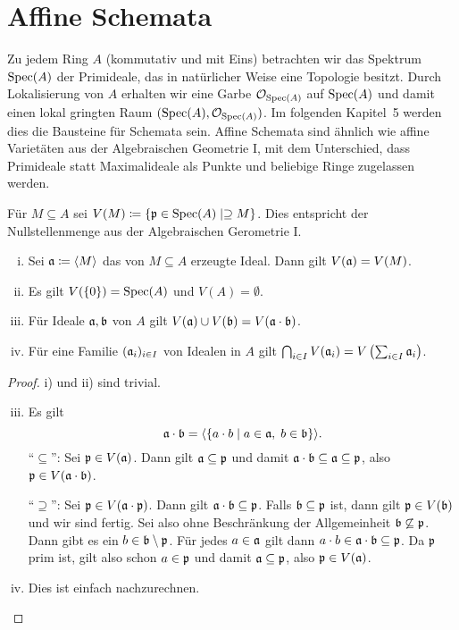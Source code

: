 
\chapter{Affine Schemata}

Zu jedem Ring $A$ (kommutativ und mit Eins) betrachten wir das Spektrum $\operatorname{Spec}(A)$ der Primideale, das in natürlicher Weise eine Topologie besitzt. Durch Lokalisierung von $A$ erhalten wir eine Garbe $\mathcal{O}_{\operatorname{Spec}(A)}$ auf $\operatorname{Spec}(A)$ und damit einen lokal gringten Raum $(\operatorname{Spec}(A),\mathcal{O}_{\operatorname{Spec}(A)})$. Im folgenden Kapitel~5 werden dies die Bausteine für Schemata sein. Affine Schemata sind ähnlich wie affine Varietäten aus der Algebraischen Geometrie I, mit dem Unterschied, dass Primideale statt Maximalideale als Punkte und beliebige Ringe zugelassen werden.

\begin{defn}
	Für $M\subseteq A$ sei $V(M)\coloneqq\{\mathfrak{p} \in \operatorname{Spec}(A) \mid \supseteq M \}$. Dies entspricht der Nullstellenmenge aus der Algebraischen Gerometrie I.
\end{defn}

\begin{lem}
\label{lem:4.2}
	\begin{enumerate}[i)]
		\item Sei $\mathfrak{a}\coloneqq \langle M \rangle$ das von $M\subseteq A$ erzeugte Ideal. Dann gilt $V(\mathfrak{a}) = V(M)$.
		\item Es gilt $V(\{0\}) = \operatorname{Spec}(A)$ und $V(A) = \emptyset$.
		\item Für Ideale $\mathfrak{a},\mathfrak{b}$ von $A$ gilt $V(\mathfrak{a}) \cup V(\mathfrak{b}) = V(\mathfrak{a} \cdot \mathfrak{b})$.
		\item Für eine Familie $(\mathfrak{a}_i)_{i\in I}$ von Idealen in $A$ gilt $\bigcap_{i\in I}V(\mathfrak{a}_i) = V\left(\sum_{i \in I} \mathfrak{a}_i\right)$.
	\end{enumerate}
	\begin{proof}
		i) und ii) sind trivial.
		\begin{enumerate}[i)]
		\setcounter{enumi}{2}
		\item Es gilt
		\[
			\mathfrak{a} \cdot \mathfrak{b} = \langle \{a \cdot b \mid a \in \mathfrak{a},\; b \in \mathfrak{b}\} \rangle .
		\]
		\enquote{$\subseteq$}: Sei $\mathfrak{p} \in V(\mathfrak{a})$. Dann gilt $\mathfrak{a} \subseteq \mathfrak{p}$ und damit $\mathfrak{a} \cdot \mathfrak{b} \subseteq \mathfrak{a} \subseteq \mathfrak{p}$, also $\mathfrak{p} \in V(\mathfrak{a} \cdot \mathfrak{b})$.

		\enquote{$\supseteq$}: Sei $\mathfrak{p} \in V(\mathfrak{a} \cdot \mathfrak{p})$. Dann gilt $\mathfrak{a} \cdot \mathfrak{b} \subseteq \mathfrak{p}$. Falls $\mathfrak{b} \subseteq \mathfrak{p}$ ist, dann gilt $\mathfrak{p} \in V(\mathfrak{b})$ und wir sind fertig. Sei also ohne Beschränkung der Allgemeinheit $\mathfrak{b} \not\subseteq \mathfrak{p}$. Dann gibt es ein $b \in \mathfrak{b} \setminus \mathfrak{p}$. Für jedes $a \in \mathfrak{a}$ gilt dann $a \cdot b \in \mathfrak{a} \cdot \mathfrak{b} \subseteq \mathfrak{p}$. Da $\mathfrak{p}$ prim ist, gilt also schon $a \in \mathfrak{p}$ und damit $\mathfrak{a} \subseteq \mathfrak{p}$, also $\mathfrak{p} \in V(\mathfrak{a})$.
		\item Dies ist einfach nachzurechnen.
		\end{enumerate}
	\end{proof}
\end{lem}

